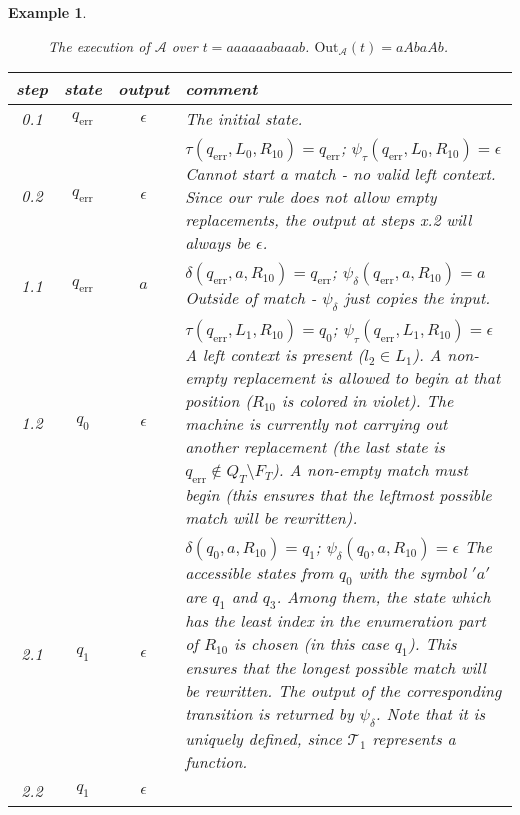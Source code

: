 \documentclass{article}
\newtheorem{example}[definition]{Example}
\begin{document}
\begin{example}
\begin{figure}[h]
		\caption{The execution of $\mathcal{A}$ over $t=aaaaaabaaab$. $\mathrm{Out}_\mathcal{A}(t) = aAbaAb$.}
		\label{fig:ex:tsbm:execution}
		\end{figure}
\iffalse
		\begin{table}[h!]
		\centering
		\begin{adjustbox}{width=1.2\textwidth,center=\textwidth}
			\begin{tabular}{c|c|c|p{130mm}}
				step & state & output & comment \\ \hline\hline
				0.1 & $q_\mathrm{err}$ & $\epsilon$ & The initial state. \\ \hline
				0.2 & $q_\mathrm{err}$ & $\epsilon$ &
					$\tau(q_\mathrm{err}, L_0, R_{10})=q_\mathrm{err}$; $\psi_\tau(q_\mathrm{err}, L_0, R_{10})=\epsilon$ \newline
				Cannot start a match - no valid left context. Since our rule does not allow empty replacements, the output at steps x.2 will always be $\epsilon$. \\ \hline
				1.1 & $q_\mathrm{err}$ & $a$ &
					$\delta(q_\mathrm{err}, a, R_{10}) = q_\mathrm{err}$; $\psi_\delta(q_\mathrm{err}, a, R_{10}) = a$ \newline
				Outside of match - $\psi_\delta$ just copies the input. \\ \hline
				1.2 & $q_0$ & $\epsilon$ & 
					$\tau(q_\mathrm{err}, L_1, R_{10})=q_0$; $\psi_\tau(q_\mathrm{err}, L_1, R_{10})=\epsilon$ \newline
				A left context is present ($l_2\in L_1$). A non-empty replacement is allowed to begin at that position ($R_{10}$ is colored in violet). The machine is currently not carrying out another replacement (the last state is $q_\mathrm{err}\notin Q_T\setminus F_T$). A non-empty match must begin (this ensures that the leftmost possible match will be rewritten). \\ \hline
				2.1 & $q_1$ & $\epsilon$ & 
					$\delta(q_0, a, R_{10}) = q_1$; $\psi_\delta(q_0, a, R_{10}) = \epsilon$ \newline
				The accessible states from $q_0$ with the symbol $'a'$ are $q_1$ and $q_3$. Among them, the state which has the least index in the enumeration part of $R_{10}$ is chosen (in this case $q_1$). This ensures that the longest possible match will be rewritten.
				The output of the corresponding transition is returned by $\psi_\delta$. Note that it is uniquely defined, since $\mathcal{T}_1$ represents a function. \\ \hline
				2.2 & $q_1$ & $\epsilon$ &

\end{tabular}
\end{adjustbox}
\end{table}
\end{example}
\end{document}

